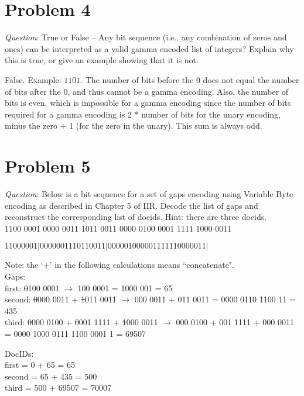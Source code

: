 \documentclass{article}
\begin{document}
\section{Problem 4}
\noindent \textit{Question}: True or False -- Any bit sequence (i.e., any combination of zeros and ones) can be interpreted as a valid
gamma encoded list of integers? Explain why this is true, or give an example showing that it is not.
\newline

False. Example: $1101$. The number of bits before the 0 does not equal the number of bits after the 0, and thus cannot be a gamma encoding. Also, the number of bits is even, which is impossible for a gamma encoding since the number of bits required for a gamma encoding is 2 * number of bits for the unary encoding, minus the zero + 1 (for the zero in the unary). This sum is always odd. 


\section{Problem 5}
\noindent \textit{Question}: Below is a bit sequence for a set of gaps encoding using Variable Byte encoding as described in Chapter 5 of
IIR. Decode the list of gaps and reconstruct the corresponding list of docids. Hint: there are three docids. \\
1100 0001 0000 0011 1011 0011 0000 0100 0001 1111 1000 0011
\newline

$1100 0001| 0000 0011 1011 0011| 0000 0100 0001 1111 1000 0011|$

\noindent Note: the `+' in the following calculations means ``concatenate". \\
\noindent Gaps: \\
first: \sout{0}100 0001 $\rightarrow$ 100 0001 = 1000 001 = 65\\
second: \sout{0}000 0011 +  \sout{1}011 0011 $\rightarrow$ 000 0011 + 011 0011  = 0000 0110 1100 11 = 435 \\
third:  \sout{0}000 0100 + \sout{0}001 1111 + \sout{1}000 0011 $\rightarrow$ 000 0100 + 001 1111 + 000 0011 = 0000 1000 0111 1100 0001 1 = 69507
\newline
\newline

\noindent DocIDs: \\
first = 0 + 65 = 65 \\
second = 65 + 435 = 500 \\ 
third = 500 + 69507 = 70007 \\
\end{document}
